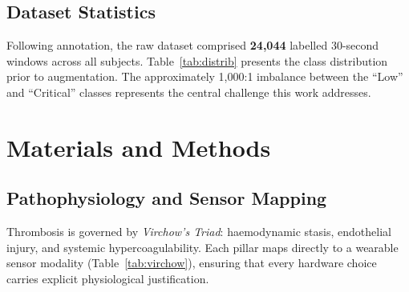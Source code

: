 \documentclass[conference]{IEEEtran}
\begin{document}
\subsection{Dataset Statistics}
Following annotation, the raw dataset comprised \textbf{24{,}044}
labelled 30-second windows across all subjects.
Table~\ref{tab:distrib} presents the class distribution prior to
augmentation.  The approximately 1{,}000:1 imbalance between the
``Low'' and ``Critical'' classes represents the central challenge this
work addresses.

\begin{table}[h]
\caption{Pre-Augmentation Class Distribution}
\label{tab:distrib}
\centering
{}
\end{table}

\section{Materials and Methods}

\subsection{Pathophysiology and Sensor Mapping}
Thrombosis is governed by \textit{Virchow's Triad}: haemodynamic
stasis, endothelial injury, and systemic hypercoagulability.  Each
pillar maps directly to a wearable sensor modality
(Table~\ref{tab:virchow}), ensuring that every hardware choice carries
explicit physiological justification.
\end{document}
